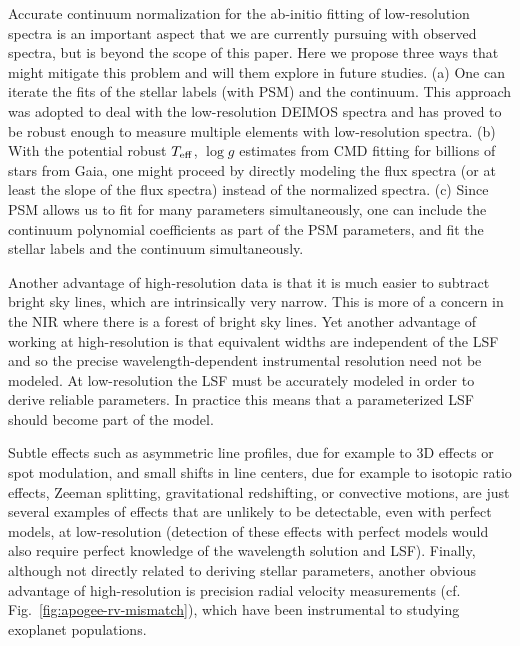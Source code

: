 \documentclass[iop]{emulateapj}
\begin{document}
\begin{CJK*}{UTF8}{gbsn}
Accurate continuum normalization for the ab-initio fitting of low-resolution spectra is an important aspect that we are currently pursuing with observed spectra, but is beyond the scope of this paper. Here we propose three ways that might mitigate this problem and will them explore in future studies. (a) One can iterate the fits of the stellar labels (with PSM) and the continuum. This approach was adopted to deal with the low-resolution DEIMOS spectra and has proved to be robust enough to measure multiple elements with low-resolution spectra. (b) With the potential robust $T_{\rm eff}$, $\log g$ estimates from CMD fitting for billions of stars from Gaia, one might proceed by directly modeling the flux spectra (or at least the slope of the flux spectra) instead of the normalized spectra. (c) Since PSM allows us to fit for many parameters simultaneously, one can include the continuum polynomial coefficients as part of the PSM parameters, and fit the stellar labels and the continuum simultaneously.

Another advantage of high-resolution data is that it is much easier to subtract bright sky lines, which are intrinsically very narrow. This is more of a concern in the NIR where there is a forest of bright sky lines. Yet another advantage of working at high-resolution is that equivalent widths are independent of the LSF and so the precise wavelength-dependent instrumental resolution need not be modeled. At low-resolution the LSF must be accurately modeled in order to derive reliable parameters. In practice this means that a parameterized LSF should become part of the model.

Subtle effects such as asymmetric line profiles, due for example to 3D effects or spot modulation, and small shifts in line centers, due for example to isotopic ratio effects, Zeeman splitting, gravitational redshifting, or convective motions, are just several examples of effects that are unlikely to be detectable, even with perfect models, at low-resolution (detection of these effects with perfect models would also require perfect knowledge of the wavelength solution and LSF). Finally, although not directly related to deriving stellar parameters, another obvious advantage of high-resolution is precision radial velocity measurements (cf. Fig.~\ref{fig:apogee-rv-mismatch}), which have been instrumental to studying exoplanet populations.


%
%
%
%
%
%


\end{CJK*}
\end{document}

